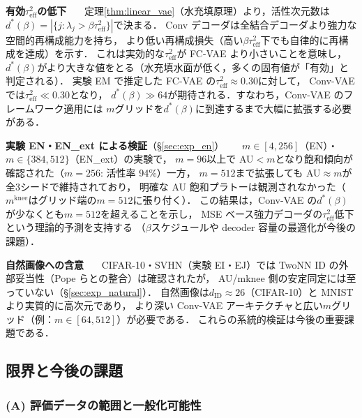 \documentclass[11pt,a4paper]{jsarticle}
\newcommand{\mknee}{m^{\mathrm{knee}}}
\begin{document}
\textbf{有効$\tau^2_\mathrm{eff}$の低下}~~~
定理\ref{thm:linear_vae}（水充填原理）より，活性次元数は
$d^*(\beta) = |\{j : \lambda_j > \beta\tau^2_\mathrm{eff}\}|$で決まる．
Conv デコーダは全結合デコーダより強力な空間的再構成能力を持ち，
より低い再構成損失（高い$\beta\tau^2_\mathrm{eff}$下でも自律的に再構成を達成）を示す．
これは実効的な$\tau^2_\mathrm{eff}$が FC-VAE より小さいことを意味し，
$d^*(\beta)$がより大きな値をとる（水充填水面が低く，多くの固有値が「有効」と判定される）．
実験 EM で推定した FC-VAE の$\tau^2_\mathrm{eff} \approx 0.30$に対して，
Conv-VAE では$\tau^2_\mathrm{eff} \ll 0.30$となり，
$d^*(\beta) \gg 64$が期待される．すなわち，Conv-VAE のフレームワーク適用には
$m$グリッドを$d^*(\beta)$に到達するまで大幅に拡張する必要がある．

\textbf{実験 EN・EN\_ext による検証}（§\ref{sec:exp_en}）~~~
$m \in [4,256]$（EN）・$m \in \{384,512\}$（EN\_ext）の実験で，
$m = 96$以上で AU$<m$となり飽和傾向が確認された（$m=256$: 活性率 94\%）一方，
$m=512$まで拡張しても AU$\approx m$が全3シードで維持されており，
明確な AU 飽和プラトーは観測されなかった（$\mknee$はグリッド端の$m=512$に張り付く）．
この結果は，Conv-VAE の$d^*(\beta)$が少なくとも$m=512$を超えることを示し，
MSE ベース強力デコーダの$\tau^2_\mathrm{eff}$低下という理論的予測を支持する
（$\beta$スケジュールや decoder 容量の最適化が今後の課題）．


\textbf{自然画像への含意}~~~
CIFAR-10・SVHN（実験 EI・EJ）では TwoNN ID の外部妥当性（Pope ら\cite{pope2021intrinsic}との整合）は確認されたが，
AU/mknee 側の安定同定には至っていない（§\ref{sec:exp_natural}）．
自然画像は$d_\mathrm{ID} \approx 26$（CIFAR-10）と MNIST より実質的に高次元であり，
より深い Conv-VAE アーキテクチャと広い$m$グリッド（例：$m \in [64, 512]$）が必要である．
これらの系統的検証は今後の重要課題である．

\subsection{限界と今後の課題}\label{sec:disc_limitation}

\subsubsection*{(A) 評価データの範囲と一般化可能性}
\end{document}
